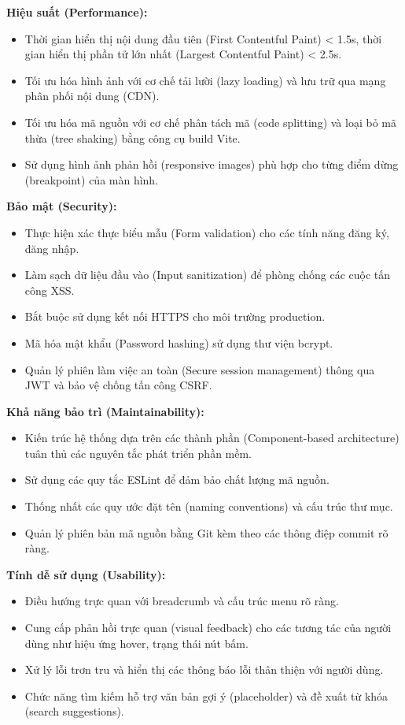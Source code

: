 \documentclass[12pt,a4paper]{report}
\begin{document}
\textbf{Hiệu suất (Performance):}
\begin{itemize}
    \item Thời gian hiển thị nội dung đầu tiên (First Contentful Paint) < 1.5s, thời gian hiển thị phần tử lớn nhất (Largest Contentful Paint) < 2.5s.
    \item Tối ưu hóa hình ảnh với cơ chế tải lười (lazy loading) và lưu trữ qua mạng phân phối nội dung (CDN).
    \item Tối ưu hóa mã nguồn với cơ chế phân tách mã (code splitting) và loại bỏ mã thừa (tree shaking) bằng công cụ build Vite.
    \item Sử dụng hình ảnh phản hồi (responsive images) phù hợp cho từng điểm dừng (breakpoint) của màn hình.
\end{itemize}

\textbf{Bảo mật (Security):}
\begin{itemize}
    \item Thực hiện xác thực biểu mẫu (Form validation) cho các tính năng đăng ký, đăng nhập.
    \item Làm sạch dữ liệu đầu vào (Input sanitization) để phòng chống các cuộc tấn công XSS.
    \item Bắt buộc sử dụng kết nối HTTPS cho môi trường production.
    \item Mã hóa mật khẩu (Password hashing) sử dụng thư viện bcrypt.
    \item Quản lý phiên làm việc an toàn (Secure session management) thông qua JWT và bảo vệ chống tấn công CSRF.
\end{itemize}

\textbf{Khả năng bảo trì (Maintainability):}
\begin{itemize}
    \item Kiến trúc hệ thống dựa trên các thành phần (Component-based architecture) tuân thủ các nguyên tắc phát triển phần mềm.
    \item Sử dụng các quy tắc ESLint để đảm bảo chất lượng mã nguồn.
    \item Thống nhất các quy ước đặt tên (naming conventions) và cấu trúc thư mục.
    \item Quản lý phiên bản mã nguồn bằng Git kèm theo các thông điệp commit rõ ràng.
\end{itemize}

\textbf{Tính dễ sử dụng (Usability):}
\begin{itemize}
    \item Điều hướng trực quan với breadcrumb và cấu trúc menu rõ ràng.
    \item Cung cấp phản hồi trực quan (visual feedback) cho các tương tác của người dùng như hiệu ứng hover, trạng thái nút bấm.
    \item Xử lý lỗi trơn tru và hiển thị các thông báo lỗi thân thiện với người dùng.
    \item Chức năng tìm kiếm hỗ trợ văn bản gợi ý (placeholder) và đề xuất từ khóa (search suggestions).
\end{itemize}
\end{document}
